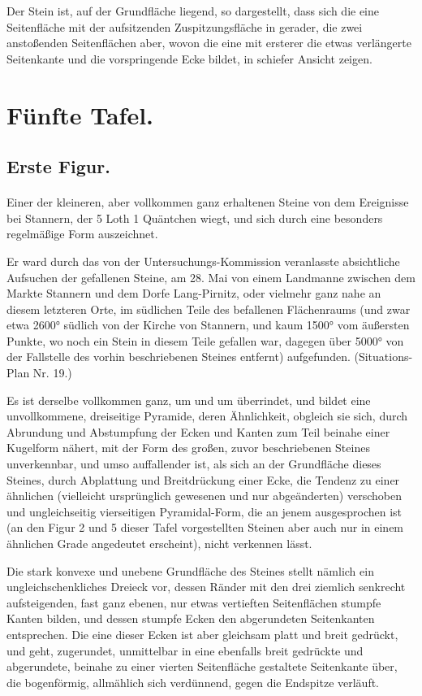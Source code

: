 \documentclass[a4paper, 11pt, oneside, german]{article}
\begin{document}
Der Stein ist, auf der Grundfläche liegend, so dargestellt, dass sich die eine Seitenfläche mit der aufsitzenden Zuspitzungsfläche in gerader, die zwei anstoßenden Seitenflächen aber, wovon die eine mit ersterer die etwas verlängerte Seitenkante und die vorspringende Ecke bildet, in schiefer Ansicht zeigen.
\clearpage
\section{Fünfte Tafel.}
\subsection{Erste Figur.}
\paragraph{}
Einer der kleineren, aber vollkommen ganz erhaltenen Steine von dem Ereignisse bei Stannern, der 5 Loth 1 Quäntchen wiegt, und sich durch eine besonders regelmäßige Form auszeichnet.

Er ward durch das von der Untersuchungs-Kommission veranlasste absichtliche Aufsuchen der gefallenen Steine, am 28. Mai von einem Landmanne zwischen dem Markte Stannern und dem Dorfe Lang-Pirnitz, oder vielmehr ganz nahe an diesem letzteren Orte, im südlichen Teile des befallenen Flächenraums (und zwar etwa 2600° südlich von der Kirche von Stannern, und kaum 1500° vom äußersten Punkte, wo noch ein Stein in diesem Teile gefallen war, dagegen über 5000° von der Fallstelle des vorhin beschriebenen Steines entfernt) aufgefunden. (Situations-Plan Nr. 19.)

Es ist derselbe vollkommen ganz, um und um überrindet, und bildet eine unvollkommene, dreiseitige Pyramide, deren Ähnlichkeit, obgleich sie sich, durch Abrundung und Abstumpfung der Ecken und Kanten zum Teil beinahe einer Kugelform nähert, mit der Form des großen, zuvor beschriebenen Steines unverkennbar, und umso auffallender ist, als sich an der Grundfläche dieses Steines, durch Abplattung und Breitdrückung einer Ecke, die Tendenz zu einer ähnlichen (vielleicht ursprünglich gewesenen und nur abgeänderten) verschoben und ungleichseitig vierseitigen Pyramidal-Form, die an jenem ausgesprochen ist (an den Figur 2 und 5 dieser Tafel vorgestellten Steinen aber auch nur in einem ähnlichen Grade angedeutet erscheint), nicht verkennen lässt.

Die stark konvexe und unebene Grundfläche des Steines stellt nämlich ein ungleichschenkliches Dreieck vor, dessen Ränder mit den drei ziemlich senkrecht aufsteigenden, fast ganz ebenen, nur etwas vertieften Seitenflächen stumpfe Kanten bilden, und dessen stumpfe Ecken den abgerundeten Seitenkanten entsprechen. Die eine dieser Ecken ist aber gleichsam platt und breit gedrückt, und geht, zugerundet, unmittelbar in eine ebenfalls breit gedrückte und abgerundete, beinahe zu einer vierten Seitenfläche gestaltete Seitenkante über, die bogenförmig, allmählich sich verdünnend, gegen die Endspitze verläuft.
\end{document}
